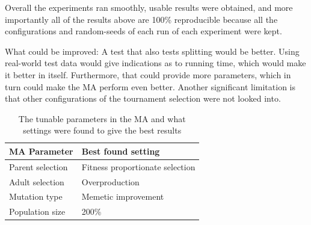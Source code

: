 Overall the experiments ran smoothly, usable results were obtained, and more importantly all of the results above are 100\% reproducible because all the configurations and random-seeds of each run of each experiment were kept.

What could be improved: A test that also tests splitting would be better. Using real-world test data would give indications as to running time, which would make it better in itself. Furthermore, that could provide more parameters, which in turn could make the MA perform even better. Another significant limitation is that other configurations of the tournament selection were not looked into.

{
\begin{table}[tbph]
\centering
\begin{tabular}{ll}
\toprule
\textbf{MA Parameter} & \textbf{Best found setting}     \\ \midrule
Parent selection      & Fitness proportionate selection \\
Adult selection       & Overproduction                  \\
Mutation type         & Memetic improvement             \\
Population size       & 200\%                           \\ \bottomrule
\end{tabular}
\caption{The tunable parameters in the MA and what settings were found to give the best results}
\label{tab:parameter_table}
\end{table}
}

\cleardoublepage
